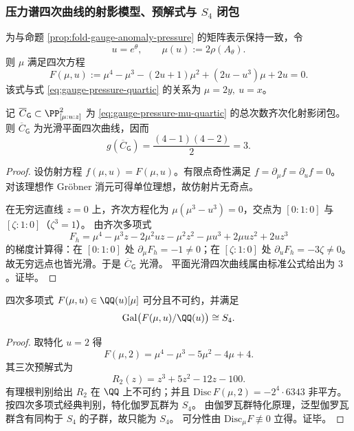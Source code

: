 \subsubsection{压力谱四次曲线的射影模型、预解式与 \texorpdfstring{$S_4$}{S4} 闭包}\label{subsubsec:gauge-pressure-s4-geometry}

为与命题 \ref{prop:fold-gauge-anomaly-pressure} 的矩阵表示保持一致，令
\[
u=e^\theta,\qquad \mu(u):=2\rho(A_\theta).
\]
则 \(\mu\) 满足四次方程
\begin{equation}\label{eq:gauge-pressure-mu-quartic}
F(\mu,u):=\mu^4-\mu^3-(2u+1)\mu^2+(2u-u^3)\mu+2u=0.
\end{equation}
该式与式 \eqref{eq:gauge-pressure-quartic} 的关系为 \(\mu=2y,\ u=x\)。

\begin{theorem}[压力谱四次曲线的光滑平面四次模型]\label{thm:gauge-pressure-plane-quartic-genus3}
记 \(\overline{C}_{\mathsf G}\subset\PP^2_{[\mu:u:z]}\) 为 \eqref{eq:gauge-pressure-mu-quartic} 的总次数齐次化射影闭包。则 \(\overline{C}_{\mathsf G}\) 为光滑平面四次曲线，因而
\[
g(\overline{C}_{\mathsf G})=\frac{(4-1)(4-2)}{2}=3.
\]
\end{theorem}
\begin{proof}
设仿射方程 \(f(\mu,u)=F(\mu,u)\)。有限点奇性满足
\(
f=\partial_\mu f=\partial_u f=0
\)。
对该理想作 Gröbner 消元可得单位理想，故仿射片无奇点。

在无穷远直线 \(z=0\) 上，齐次方程化为
\(
\mu(\mu^3-u^3)=0
\)，交点为 \([0:1:0]\) 与 \([\zeta:1:0]\)（\(\zeta^3=1\)）。
由齐次多项式
\[
F_h=\mu^{4}-\mu^{3}z-2\mu^{2}uz-\mu^{2}z^{2}-\mu u^{3}+2\mu uz^{2}+2uz^{3}
\]
的梯度计算得：在 \([0:1:0]\) 处 \(\partial_\mu F_h=-1\neq 0\)；在 \([\zeta:1:0]\) 处 \(\partial_u F_h=-3\zeta\neq 0\)。
故无穷远点也皆光滑。于是 \(\overline{C}_{\mathsf G}\) 光滑。
平面光滑四次曲线属由标准公式给出为 \(3\)。证毕。
\end{proof}

\begin{theorem}\label{thm:gauge-pressure-generic-galois-s4}
四次多项式 \(F(\mu,u)\in \QQ(u)[\mu]\) 可分且不可约，并满足
\[
\mathrm{Gal}\bigl(F(\mu,u)/\QQ(u)\bigr)\cong S_4.
\]
\end{theorem}
\begin{proof}
取特化 \(u=2\) 得
\[
F(\mu,2)=\mu^4-\mu^3-5\mu^2-4\mu+4.
\]
其三次预解式为
\[
R_2(z)=z^3+5z^2-12z-100.
\]
有理根判别给出 \(R_2\) 在 \(\QQ\) 上不可约；并且
\(
\mathrm{Disc}\,F(\mu,2)=-2^4\cdot 6343
\)
非平方。
按四次多项式经典判别，特化伽罗瓦群为 \(S_4\)。
由伽罗瓦群特化原理，泛型伽罗瓦群含有同构于 \(S_4\) 的子群，故只能为 \(S_4\)。
可分性由 \(\mathrm{Disc}_\mu F\not\equiv 0\) 立得。证毕。
\end{proof}

